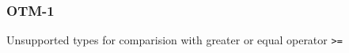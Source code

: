 \subsubsection{OTM-1}\label{sec:error_code_otm_1}

Unsupported types for comparision with greater or equal operator \texttt{>=}


